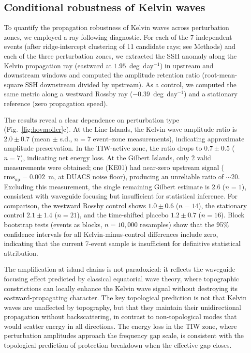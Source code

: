 \documentclass[11pt]{article}
\begin{document}
\subsection{Conditional robustness of Kelvin waves}

To quantify the propagation robustness of Kelvin waves across perturbation zones, we employed a ray-following diagnostic. For each of the 7 independent events (after ridge-intercept clustering of 11 candidate rays; see Methods) and each of the three perturbation zones, we extracted the SSH anomaly along the Kelvin propagation ray (eastward at $1.95$~deg~day$^{-1}$) in upstream and downstream windows and computed the amplitude retention ratio (root-mean-square SSH downstream divided by upstream). As a control, we computed the same metric along a westward Rossby ray ($-0.39$~deg~day$^{-1}$) and a stationary reference (zero propagation speed).

The results reveal a clear dependence on perturbation type (Fig.~\ref{fig:hovmoller}c). At the Line Islands, the Kelvin wave amplitude ratio is $2.0 \pm 0.7$ (mean $\pm$ s.d., $n = 7$ event--zone measurements), indicating approximate amplitude preservation. In the TIW-active zone, the ratio drops to $0.7 \pm 0.5$ ($n = 7$), indicating net energy loss. At the Gilbert Islands, only 2 valid measurements were obtained; one (KE01) had near-zero upstream signal ($\mathrm{rms}_\mathrm{up} = 0.002$~m, at DUACS noise floor), producing an unreliable ratio of ${\sim}20$. Excluding this measurement, the single remaining Gilbert estimate is $2.6$ ($n = 1$), consistent with waveguide focusing but insufficient for statistical inference. For comparison, the westward Rossby control shows $1.0 \pm 0.6$ ($n = 14$), the stationary control $2.1 \pm 1.4$ ($n = 21$), and the time-shifted placebo $1.2 \pm 0.7$ ($n = 16$). Block bootstrap tests (events as blocks, $n = 10{,}000$ resamples) show that the 95\% confidence intervals for all Kelvin-minus-control differences include zero, indicating that the current 7-event sample is insufficient for definitive statistical attribution.

The amplification at island chains is not paradoxical: it reflects the waveguide focusing effect predicted by classical equatorial wave theory, where topographic constrictions can locally enhance the Kelvin wave signal without destroying its eastward-propagating character\cite{McPhaden1987}. The key topological prediction is not that Kelvin waves are unaffected by topography, but that they maintain their unidirectional propagation without backscattering, in contrast to non-topological modes that would scatter energy in all directions. The energy loss in the TIW zone, where perturbation amplitudes approach the frequency gap scale, is consistent with the topological prediction of protection breakdown when the effective gap closes.
\end{document}
